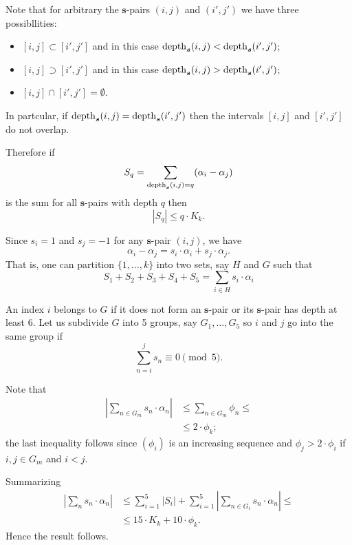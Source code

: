 \documentclass[a4paper,10pt]{amsart}
\begin{document}
Note that for arbitrary the $\bm{s}$-pairs $(i,j)$ and $(i',j')$
we have three possibllities:
\begin{itemize}
\item $[i,j]\subset [i',j']$ and in this case $\mathop{\rm depth}\nolimits_{\bm{s}}(i,j)<\mathop{\rm depth}\nolimits_{\bm{s}}(i',j')$;
\item $[i,j]\supset [i',j']$ and in this case $\mathop{\rm depth}\nolimits_{\bm{s}}(i,j)>\mathop{\rm depth}\nolimits_{\bm{s}}(i',j')$;
\item $[i,j]\cap [i',j']=\emptyset$.
\end{itemize}
In partcular, if $\mathop{\rm depth}\nolimits_{\bm{s}}(i,j)=\mathop{\rm depth}\nolimits_{\bm{s}}(i',j')$ then the intervals $[i,j]$ and $[i',j']$ do not overlap.


Therefore if 
\[S_q=\sum_{\mathop{\rm depth}\nolimits_{\bm{s}}(i,j)=q} (\alpha_i-\alpha_j)\] 
is the sum for all $\bm{s}$-pairs with depth $q$ then 
\[|S_q|\le q\cdot K_k.\]

Since $s_i=1$ and $s_j=-1$ for any $\bm{s}$-pair $(i,j)$,
we have
\[\alpha_i-\alpha_j=s_i\cdot\alpha_i+s_j\cdot\alpha_j.\]
That is, one can partition $\{1,\dots,k\}$ into two sets, say $H$ and $G$ such that
\[S_1+S_2+S_3+S_4+S_5=\sum_{i\in H}s_i\cdot \alpha_i\] 

An index $i$ belongs to $G$ 
if it does not form an $\bm{s}$-pair 
or its $\bm{s}$-pair has depth at least $6$.
Let us subdivide $G$ into 5 groups, say $G_1,\dots,G_5$ 
so $i$ and $j$ go into the same group if 
\[\sum_{n=i}^j s_n\equiv 0\pmod 5.\]

Note that
\begin{align*}
|\sum_{n\in G_m}s_n\cdot \alpha_n|
&\le \sum_{n\in G_m}\phi_n\le
\\
&\le 2\cdot\phi_k;
\end{align*}
the last inequality follows since $(\phi_i)$ is an increasing sequence 
and
$\phi_j>2\cdot \phi_i$
if $i,j\in G_m$ and $i<j$.

Summarizing
\begin{align*}
|\sum_n s_n\cdot\alpha_n|&\le 
\sum_{i=1}^5|S_i|
+
\sum_{i=1}^5\left|\sum_{n\in G_i} s_n\cdot\alpha_n\right|\le
\\
&\le 15\cdot K_k+10\cdot \phi_k.
\end{align*}
Hence the result follows.
\qeds


\sloppy
\printbibliography[heading=bibintoc]
\fussy
\end{document}
